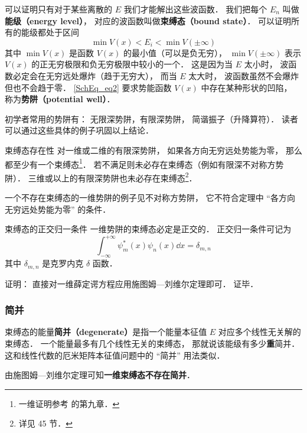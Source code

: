 可以证明只有对于某些离散的 $E$ 我们才能解出这些波函数． 我们把每个 $E_n$ 叫做\textbf{能级（energy level）}， 对应的波函数叫做\textbf{束缚态（bound state）}． 可以证明所有的能级都处于区间
\begin{equation}\label{SchEq_eq2}
\min V(x) < E_i < \min V(\pm\infty)
\end{equation}
其中 $\min V(x)$ 是函数 $V(x)$ 的最小值（可以是负无穷）， $\min V(\pm\infty)$ 表示 $V(x)$ 的正无穷极限和负无穷极限中较小的一个． 这是因为当 $E$ 太小时， 波函数必定会在无穷远处爆炸（趋于无穷大）， 而当 $E$ 太大时， 波函数虽然不会爆炸但也不会趋于零． \autoref{SchEq_eq2} 要求势能函数 $V(x)$ 中存在某种形状的凹陷， 称为\textbf{势阱（potential well）}．

初学者常用的势阱有： 无限深势阱，有限深势阱， 简谐振子（升降算符）． 读者可以通过这些具体的例子巩固以上结论．

\begin{theorem}{束缚态存在性}
对一维或二维的有限深势阱， 如果各方向无穷远处势能为零， 那么都至少有一个束缚态\footnote{一维证明参考 \cite{Teschl} 的第九章．}． 若不满足则未必存在束缚态（例如有限深不对称方势阱）． 三维或以上的有限深势阱也未必存在束缚态\footnote{详见 \cite{Landau} 45 节．}．
\end{theorem}
一个不存在束缚态的一维势阱的例子见不对称方势阱， 它不符合定理中 “各方向无穷远处势能为零” 的条件．

\begin{theorem}{束缚态的正交归一条件}
一维势阱的束缚态必定是正交的． 正交归一条件可记为
\begin{equation}
\int_{-\infty}^{+\infty} \psi^*_m(x) \psi_n(x)\dd{x} = \delta_{m,n}
\end{equation}
其中 $\delta_{m,n}$ 是克罗内克 $\delta$ 函数．
\end{theorem}
证明： 直接对一维薛定谔方程应用施图姆—刘维尔定理即可． 证毕．

\subsubsection{简并}
束缚态的能量\textbf{简并（degenerate）}是指一个能量本征值 $E$ 对应多个线性无关解的束缚态． 一个能量最多有几个线性无关的束缚态， 那就说该能级有多少\textbf{重}简并． 这和线性代数的厄米矩阵本征值问题中的 “简并” 用法类似．

由施图姆—刘维尔定理可知\textbf{一维束缚态不存在简并}．


